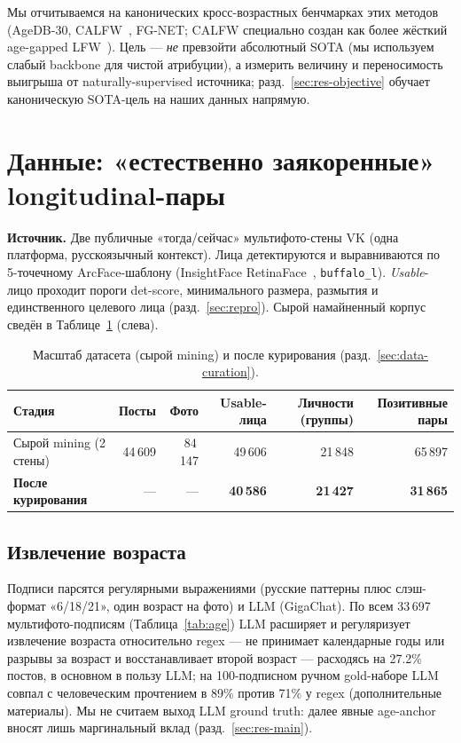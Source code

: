 \documentclass[journal]{IEEEtran}
\begin{document}
Мы отчитываемся на канонических кросс-возрастных бенчмарках этих методов (AgeDB-30, CALFW~\cite{zheng2017calfw}, FG-NET; CALFW специально создан как более жёсткий age-gapped LFW~\cite{huang2007lfw}). Цель --- \emph{не} превзойти абсолютный SOTA (мы используем слабый backbone для чистой атрибуции), а измерить величину и переносимость выигрыша от naturally-supervised источника; разд.~\ref{sec:res-objective} обучает каноническую SOTA-цель на наших данных напрямую.

\section{Данные: «естественно заякоренные» longitudinal-пары}\label{sec:data}
\textbf{Источник.} Две публичные «тогда/сейчас» мультифото-стены VK (одна платформа, русскоязычный контекст). Лица детектируются и выравниваются по 5-точечному ArcFace-шаблону (InsightFace RetinaFace~\cite{deng2020retinaface}, \texttt{buffalo\_l}). \emph{Usable}-лицо проходит пороги det-score, минимального размера, размытия и единственного целевого лица (разд.~\ref{sec:repro}). Сырой намайненный корпус сведён в Таблице~\ref{tab:scale} (слева).

\begin{table}[!t]
\renewcommand{\arraystretch}{1.2}
\caption{Масштаб датасета (сырой mining) и после курирования (разд.~\ref{sec:data-curation}).}
\label{tab:scale}
\centering
\footnotesize
\begin{tabular}{@{}lrrrrr@{}}
\toprule
Стадия & Посты & Фото & Usable-лица & Личности (группы) & Позитивные пары \\
\midrule
Сырой mining (2 стены) & 44\,609 & 84\,147 & 49\,606 & 21\,848 & 65\,897 \\
\textbf{После курирования} & --- & --- & \textbf{40\,586} & \textbf{21\,427} & \textbf{31\,865} \\
\bottomrule
\end{tabular}
\end{table}

\subsection{Извлечение возраста}\label{sec:data-age}
Подписи парсятся регулярными выражениями (русские паттерны плюс слэш-формат «6/18/21», один возраст на фото) и LLM (GigaChat). По всем 33\,697 мультифото-подписям (Таблица~\ref{tab:age}) LLM расширяет и регуляризует извлечение возраста относительно regex --- не принимает календарные годы или разрывы за возраст и восстанавливает второй возраст --- расходясь на 27.2\% постов, в основном в пользу LLM; на 100-подписном ручном gold-наборе LLM совпал с человеческим прочтением в 89\% против 71\% у regex (дополнительные материалы). Мы не считаем выход LLM ground truth: далее явные age-anchor вносят лишь маргинальный вклад (разд.~\ref{sec:res-main}).
\end{document}

